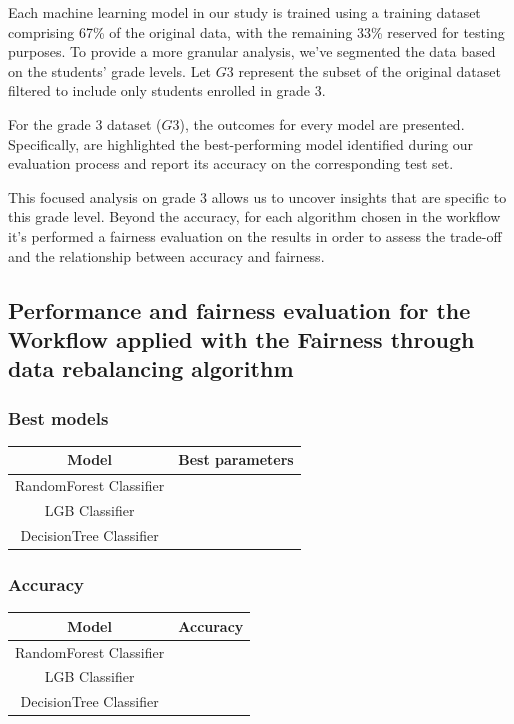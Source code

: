 \documentclass[12pt,a4paper,openright,twoside]{book}
\begin{document}
Each machine learning model in our study is trained using a training dataset comprising 67\% of the original data, with the remaining 33\% reserved for testing purposes. To provide a more granular analysis, we've segmented the data based on the students' grade levels. Let \( G3 \) represent the subset of the original dataset filtered to include only students enrolled in grade 3.

For the grade 3 dataset (\( G3 \)), the outcomes for every model are presented. Specifically, are highlighted the best-performing model identified during our evaluation process and report its accuracy on the corresponding test set.

This focused analysis on grade 3 allows us to uncover insights that are specific to this grade level. Beyond the accuracy, for each algorithm chosen in the workflow it's performed a fairness evaluation on the results in order to assess the trade-off and the relationship between accuracy and fairness.

\subsection{Performance and fairness evaluation for the Workflow applied with the Fairness through data rebalancing algorithm}

\subsubsection{Best models}

\begin{tabular}{|c|c|}
    \hline
    \textbf{Model} & \textbf{Best parameters} \\
    \hline
    RandomForest Classifier  &  \\
    \hline
    LGB Classifier & \\
    \hline
    DecisionTree Classifier & \\
    \hline
\end{tabular}

\subsubsection{Accuracy}

\begin{tabular}{|c|c|}
    \hline
    \textbf{Model} & \textbf{Accuracy} \\ 
    \hline
    RandomForest Classifier  &  \\
    \hline
    LGB Classifier & \\
    \hline
    DecisionTree Classifier & \\ 
    \hline
\end{tabular}
\end{document}
